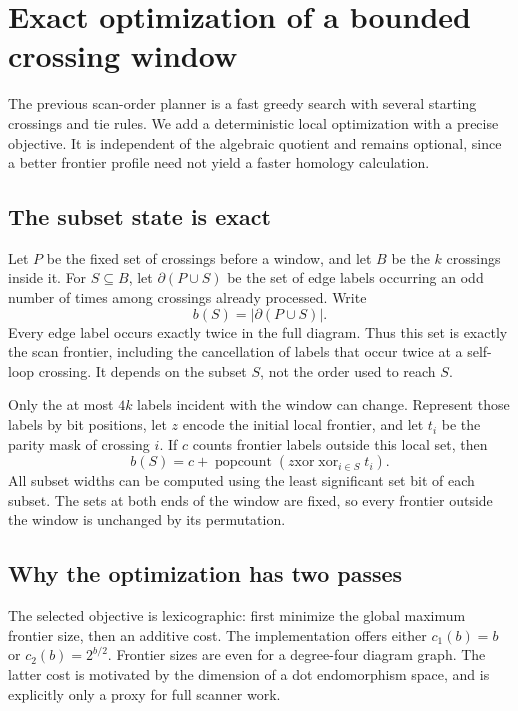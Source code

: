 \section{Exact optimization of a bounded crossing window}
\label{sec:ordering}

The previous scan-order planner is a fast greedy search with several starting
crossings and tie rules. We add a deterministic local optimization with a
precise objective. It is independent of the algebraic quotient and remains
optional, since a better frontier profile need not yield a faster homology
calculation.

\subsection{The subset state is exact}
Let $P$ be the fixed set of crossings before a window, and let $B$ be the
$k$ crossings inside it.
For $S\subseteq B$, let $\partial(P\cup S)$ be the set of edge labels occurring
an odd number of times among crossings already processed. Write
\[
 b(S)=|\partial(P\cup S)|.
\]
Every edge label occurs exactly twice in the full diagram. Thus this set is
exactly the scan frontier, including the cancellation of labels that occur
twice at a self-loop crossing. It depends on the subset $S$, not the order
used to reach $S$.

Only the at most $4k$ labels incident with the window can change. Represent
those labels by bit positions, let $z$ encode the initial local frontier, and
let $t_i$ be the parity mask of crossing $i$. If $c$ counts frontier labels
outside this local set, then
\begin{equation}\label{eq:subsetwidth}
 b(S)=c+\operatorname{popcount}\left(z\mathbin{\mathrm{xor}}
                    \mathop{\mathrm{xor}}_{i\in S}t_i\right).
\end{equation}
All subset widths can be computed using the least significant set bit of
each subset. The sets at both ends of the window are fixed, so every frontier
outside the window is unchanged by its permutation.

\subsection{Why the optimization has two passes}
The selected objective is lexicographic: first minimize the global maximum
frontier size, then an additive cost. The implementation offers either
$c_1(b)=b$ or $c_2(b)=2^{b/2}$. Frontier sizes are even for a degree-four
diagram graph. The latter cost is motivated by the dimension of a dot
endomorphism space, and is explicitly only a proxy for full scanner work.

